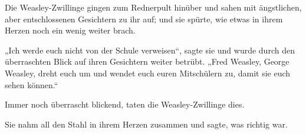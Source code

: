 Die Weasley-Zwillinge gingen zum Rednerpult hinüber und sahen mit ängstlichen, aber entschlossenen Gesichtern zu ihr auf; und sie spürte, wie etwas in ihrem Herzen noch ein wenig weiter brach.

„Ich werde euch nicht von der Schule verweisen“, sagte sie und wurde durch den überraschten Blick auf ihren Gesichtern weiter betrübt.
„Fred Weasley, George Weasley, dreht euch um und wendet euch euren Mitschülern zu, damit sie euch sehen können.“

Immer noch überrascht blickend, taten die Weasley-Zwillinge dies.

Sie nahm all den Stahl in ihrem Herzen zusammen und sagte, was richtig war.

